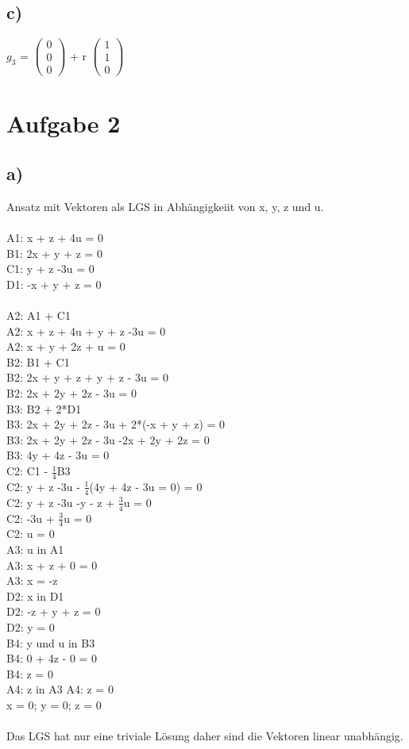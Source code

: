 \documentclass{article}
\begin{document}
	\subsection*{c)}
	$g_3$ = 
	$\left(\begin{array}{c}
	0 \\ 0 \\ 0
	\end{array}\right)$
	+ r
	$\left(\begin{array}{c}
	1 \\ 1 \\ 0
	\end{array}\right)$
	\section*{Aufgabe 2}
	\subsection*{a)}
	Ansatz mit Vektoren als LGS in Abhängigkeiit von x, y, z und u. \\ \\
	A1: x + z + 4u = 0\\
	B1: 2x + y + z = 0\\
	C1: y + z -3u = 0 \\
	D1: -x + y + z = 0\\
	\\
	A2: A1 + C1 \\
	A2: x + z + 4u + y + z -3u = 0 \\
	A2: x + y + 2z + u = 0 \\
	B2: B1 + C1 \\
	B2: 2x + y + z + y + z - 3u  = 0\\
	B2: 2x + 2y + 2z - 3u = 0 \\
	B3: B2 + 2*D1 \\
	B3: 2x + 2y + 2z - 3u + 2*(-x + y + z) = 0 \\
	B3: 2x + 2y + 2z - 3u -2x + 2y + 2z = 0 \\
	B3: 4y + 4z - 3u = 0 \\
	C2: C1 - $\frac{1}{4}$B3 \\
	C2: y + z -3u - $\frac{1}{4}$(4y + 4z - 3u = 0) = 0 \\
	C2: y + z -3u -y - z + $\frac{3}{4}$u = 0 \\
	C2: -3u + $\frac{3}{4}$u = 0 \\
	C2: u = 0 \\
	A3: u in A1 \\
	A3: x + z + 0 = 0 \\
	A3: x  = -z \\
	D2: x in D1 \\
	D2: -z + y + z = 0\\
	D2: y = 0\\
	B4: y und u in B3 \\
	B4: 0 + 4z - 0 = 0 \\
	B4:  z = 0 \\
	A4: z in A3
	A4: z = 0 \\ 
	x = 0; y = 0; z = 0 \\ \\
	Das LGS hat nur eine triviale Lösung daher sind die Vektoren linear unabhängig.
\end{document}
